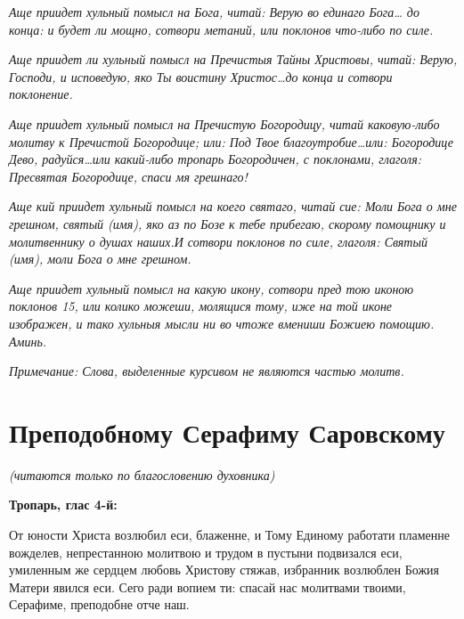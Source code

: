 \itshape Аще приидет хульный помысл на Бога, читай:\normalfont{} Верую во единаго Бога\itshape … до конца: и будет ли мощно, сотвори метаний, или поклонов что-либо по силе.\normalfont{}


\itshape Аще приидет ли хульный помысл на Пречистыя Тайны Христовы, читай:\normalfont{}  Верую, Господи, и исповедую, яко Ты воистину Христос…\itshape  до конца и сотвори поклонение.\normalfont{}


\itshape Аще приидет хульный помысл на Пречистую Богородицу, читай каковую-либо молитву к Пречистой Богородице; или:\normalfont{}  Под Твое благоутробие…\itshape  или:\normalfont{}  Богородице Дево, радуйся…\itshape  или какий-либо тропарь Богородичен, с поклонами, глаголя:\normalfont{} Пресвятая Богородице, спаси мя грешнаго!

\itshape Аще кий приидет хульный помысл на коего святаго, читай сие\normalfont{}: Моли Бога о мне грешном, святый (\itshape имя\normalfont{}), яко аз по Бозе к тебе прибегаю, скорому помощнику и молитвеннику о душах наших.\itshape  И сотвори поклонов по силе, глаголя:\normalfont{}  Святый (\itshape имя\normalfont{}), моли Бога о мне грешном.

\itshape Аще приидет хульный помысл на какую икону, сотвори пред тою иконою поклонов 15, или колико можеши, молящися тому, иже на той иконе изображен, и тако хульныя мысли ни во чтоже вмениши Божиею помощию. Аминь.\normalfont{}


\itshape Примечание: Слова, выделенные курсивом не являются частью молитв.\normalfont{}





\section{Преподобному  Серафиму Саровскому}
 


\itshape (читаются только по благословению духовника)

\normalfont{}

\bfseries Тропарь, глас 4-й\normalfont{}\bfseries :  \normalfont{}


От юности Христа возлюбил еси, блаженне, и Тому Единому работати пламенне вожделев, непрестанною молитвою и трудом в пустыни подвизался еси, умиленным же сердцем любовь Христову стяжав, избранник возлюблен Божия Матери явился еси. Сего ради вопием ти: спасай нас молитвами твоими, Серафиме, преподобне отче наш. 

